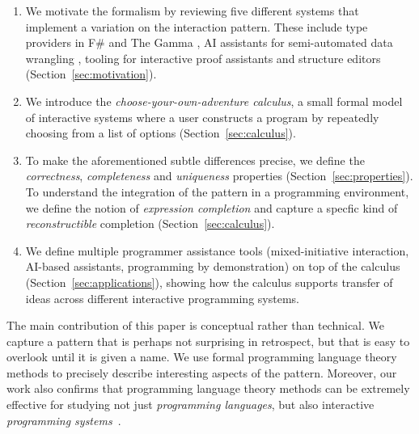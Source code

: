 \documentclass[nonacm,anonymous,sigplan,screen]{acmart}
\begin{document}
\begin{enumerate}
\setlength{\itemsep}{5pt}
\item We motivate the formalism by reviewing five different systems that implement a variation on the
interaction pattern. These include type providers in F\# and
The Gamma \cite{syme-2013-inforich,petricek-2022-thegamma,petricek-2017-dotdriven},
AI assistants for semi-automated data wrangling \cite{petricek-2023-aias}, tooling for
interactive proof assistants \cite{altenkirch-1994-alf,brady-2015-idris,verter-2024-mixed}
and structure editors \cite{beckmann-2023-all} (Section~\ref{sec:motivation}).

\item We introduce the \emph{choose-your-own-adventure calculus}, a small formal model of
interactive systems where a user constructs a program by repeatedly choosing from a list
of options (Section~\ref{sec:calculus}).

\item To make the aforementioned subtle differences precise, we define the
\emph{correctness}, \emph{completeness} and \emph{uniqueness} properties
(Section~\ref{sec:properties}). To understand the integration of the pattern in
a programming environment, we define the notion of \emph{expression completion} and capture
a specfic kind of \emph{reconstructible} completion (Section~\ref{sec:calculus}).

\item We define multiple programmer assistance tools (mixed-initiative interaction,
AI-based assistants, programming by demonstration) on top of the calculus
(Section~\ref{sec:applications}), showing how the calculus
supports transfer of ideas across different interactive programming systems.
\end{enumerate}

The main contribution of this paper is conceptual rather than technical. We capture a
pattern that is perhaps not surprising in retrospect, but that is easy to overlook until it is
given a name. We use formal programming language theory methods to precisely describe
interesting aspects of the pattern. Moreover, our work also confirms that programming
language theory methods can be extremely effective for studying not just \emph{programming
languages}, but also interactive \emph{programming systems}~\cite{jakubovic-2023-techdims}.

\end{document}

